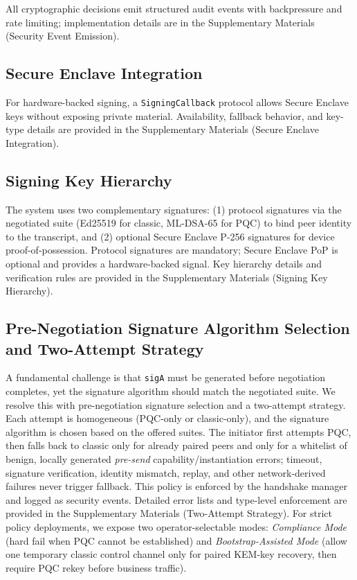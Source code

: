 \documentclass[10pt,journal,compsoc]{IEEEtran}
\begin{document}
All cryptographic decisions emit structured audit events with
backpressure and rate limiting; implementation details are in the
Supplementary Materials (Security Event Emission).

\subsection{Secure Enclave
Integration}\label{e.-secure-enclave-integration}

For hardware-backed signing, a \texttt{SigningCallback} protocol allows
Secure Enclave keys without exposing private material. Availability,
fallback behavior, and key-type details are provided in the
Supplementary Materials (Secure Enclave Integration).

\subsection{Signing Key Hierarchy}\label{f.-signing-key-hierarchy}

The system uses two complementary signatures: (1) protocol signatures
via the negotiated suite (Ed25519 for classic, ML-DSA-65 for PQC) to bind
peer identity to the transcript, and (2) optional Secure Enclave
P-256 signatures for device proof-of-possession. Protocol signatures are
mandatory; Secure Enclave PoP is optional and provides a hardware-backed
signal. Key hierarchy details and verification rules are provided in the
Supplementary Materials (Signing Key Hierarchy).

\subsection{Pre-Negotiation Signature Algorithm Selection and
Two-Attempt
Strategy}\label{g.-pre-negotiation-signature-algorithm-selection-and-two-attempt-strategy}

A fundamental challenge is that \texttt{sigA} must be generated before
negotiation completes, yet the signature algorithm should match the
negotiated suite. We resolve this with pre-negotiation signature
selection and a two-attempt strategy. Each attempt is homogeneous
(PQC-only or classic-only), and the signature algorithm is chosen based
on the offered suites. The initiator first attempts PQC, then falls back
to classic only for already paired peers and only for a whitelist of
benign, locally generated \emph{pre-send} capability/instantiation
errors; timeout, signature
verification, identity mismatch, replay, and other network-derived
failures never trigger fallback. This policy is enforced by the
handshake manager and logged as security events. Detailed error lists
and type-level enforcement are provided in the Supplementary Materials
(Two-Attempt Strategy).
For strict policy deployments, we expose two operator-selectable modes:
\emph{Compliance Mode} (hard fail when PQC cannot be established) and
\emph{Bootstrap-Assisted Mode} (allow one temporary classic control
channel only for paired KEM-key recovery, then require PQC rekey before
business traffic).
\end{document}
